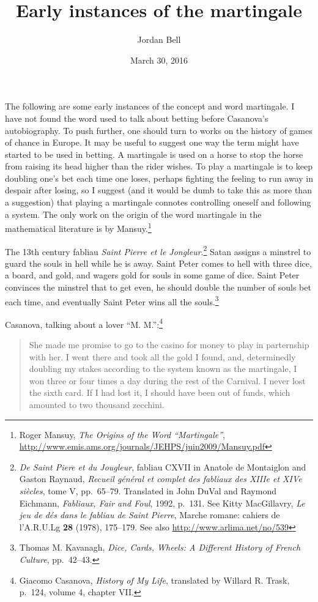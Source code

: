 \documentclass{article}
\begin{document}
\title{Early instances of the martingale}
\author{Jordan Bell}
\date{March 30, 2016}

\maketitle

The following are some early instances of the concept and word martingale. I have not found the word used to talk about betting before
Casanova's autobiography. To push further, one should turn to works on the history of games of chance in Europe. 
It may be useful to suggest one way the term might have started to be used in betting. A martingale is used on a horse to stop the horse from raising its head higher than the rider
wishes. To play a martingale is to keep doubling one's bet each time one loses, perhaps fighting the feeling to run away in despair after losing, so
I suggest (and it would be dumb to take this as more than a suggestion) that playing a martingale connotes controlling oneself and following a system. The only work on the origin
of the word martingale in the mathematical literature  is by Mansuy.\footnote{Roger Mansuy,
{\em The Origins of the Word ``Martingale''},
\url{http://www.emis.ams.org/journals/JEHPS/juin2009/Mansuy.pdf}}


The 13th century fabliau {\em Saint Pierre et le Jongleur}.\footnote{{\em De Saint Piere et du Jougleur}, 
fabliau CXVII in Anatole de Montaiglon and 
Gaston Raynaud, {\em Recueil g\'en\'eral et complet des fabliaux des XIIIe et XIVe si\`ecles}, tome V, pp.~65--79. Translated
in John DuVal and Raymond Eichmann, {\em Fabliaux, Fair and Foul}, 1992, p.~131. See 
Kitty MacGillavry, {\em Le jeu de d\'es dans le fabliau de Saint Pierre}, 
Marche romane: cahiers de l'A.R.U.Lg \textbf{28} (1978), 175--179. See also \url{http://www.arlima.net/no/539}}
Satan assigns a minstrel to guard the souls in hell while he is away. Saint Peter 
comes to hell with three dice, a board, and gold, and wagers  gold for souls in some game of dice.
Saint Peter convinces the minstrel that to get even, he should  double the number of souls bet
each time, and eventually Saint Peter wins all the souls.\footnote{Thomas M. Kavanagh,
{\em Dice, Cards, Wheels: A Different History of French Culture}, pp.~42--43.}

Casanova, talking about a lover ``M. M.'':\footnote{Giacomo Casanova, {\em History of My Life},
translated by Willard R. Trask, p.~124, volume 4, chapter VII.}


\begin{quote}
She made me promise to go to the casino for money to play in parternship with her. I went there
and took all the gold I found, and, determinedly doubling my stakes according to the system known
as the martingale, I won three or four times a day during the rest of the Carnival.
I never lost the sixth card. If I had lost it, I should have been out of funds, which amounted
to two thousand zecchini.
\end{quote}
\end{document}
